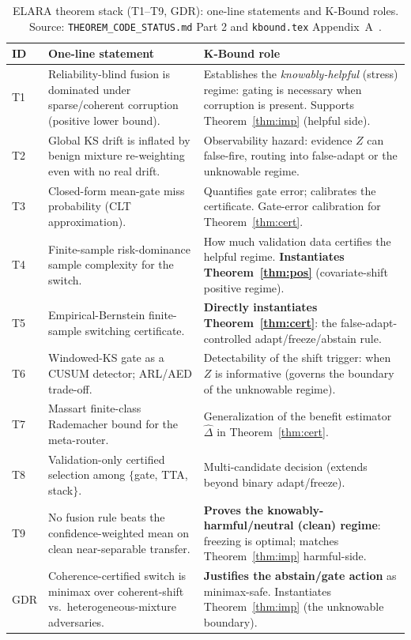 \begin{table}[ht]
\centering
\small
\caption{ELARA theorem stack (T1--T9, GDR): one-line statements and K-Bound roles.
Source: \texttt{THEOREM\_CODE\_STATUS.md} Part 2 and \texttt{kbound.tex}
Appendix~A~\cite{kbound2026repo}.}
\label{tab:elara-stack}
\begin{tabular}{p{}p{}p{}}
\toprule
ID & One-line statement & K-Bound role \\
\midrule
T1 & Reliability-blind fusion is dominated under sparse/coherent corruption
   (positive lower bound).
 & Establishes the \emph{knowably-helpful} (stress) regime: gating is
   necessary when corruption is present. Supports Theorem~\ref{thm:imp} (helpful
   side). \\
T2 & Global KS drift is inflated by benign mixture re-weighting even with no real
   drift.
 & Observability hazard: evidence $Z$ can false-fire, routing into false-adapt or the
   unknowable regime. \\
T3 & Closed-form mean-gate miss probability (CLT approximation).
 & Quantifies gate error; calibrates the certificate. Gate-error calibration for
   Theorem~\ref{thm:cert}. \\
T4 & Finite-sample risk-dominance sample complexity for the switch.
 & How much validation data certifies the helpful regime.
   \textbf{Instantiates Theorem~\ref{thm:pos}} (covariate-shift positive regime). \\
T5 & Empirical-Bernstein finite-sample switching certificate.
 & \textbf{Directly instantiates Theorem~\ref{thm:cert}}: the false-adapt-controlled
   adapt/freeze/abstain rule. \\
T6 & Windowed-KS gate as a CUSUM detector; ARL/AED trade-off.
 & Detectability of the shift trigger: when $Z$ is informative (governs the
   boundary of the unknowable regime). \\
T7 & Massart finite-class Rademacher bound for the meta-router.
 & Generalization of the benefit estimator $\widehat{\Delta}$ in
   Theorem~\ref{thm:cert}. \\
T8 & Validation-only certified selection among $\{$gate, TTA, stack$\}$.
 & Multi-candidate \KGA{} decision (extends beyond binary adapt/freeze). \\
T9 & No fusion rule beats the confidence-weighted mean on clean near-separable
   transfer.
 & \textbf{Proves the knowably-harmful/neutral (clean) regime}: freezing is
   optimal; matches Theorem~\ref{thm:imp} harmful-side. \\
GDR & Coherence-certified switch is minimax over coherent-shift vs.\
    heterogeneous-mixture adversaries.
 & \textbf{Justifies the abstain/gate action} as minimax-safe.
   Instantiates Theorem~\ref{thm:imp} (the unknowable boundary). \\
\bottomrule
\end{tabular}
\end{table}

